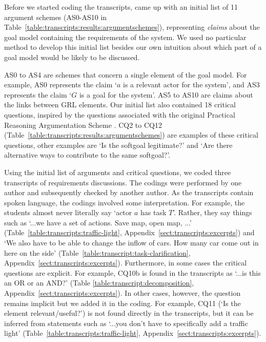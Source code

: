 Before we started coding the transcripts, came up with an initial list of 11 argument schemes (AS0-AS10 in Table~\ref{table:transcripts:results:argumentschemes}), representing \emph{claims} about the goal model containing the requirements of the system. We used no particular method to develop this initial list besides our own intuition about which part of a goal model would be likely to be discussed.

AS0 to AS4 are schemes that concern a single element of the goal model. For example, AS0 represents the claim `$a$ is a relevant actor for the system', and AS3 represents the claim `$G$ is a goal for the system'. AS5 to AS10 are claims about the links between GRL elements. Our initial list also contained 18 critical questions, inspired by the questions associated with the original Practical Reasoning Argumentation Scheme \cite{atkinson2007}. CQ2 to CQ12 (Table~\ref{table:transcripts:results:argumentschemes}) are examples of these critical questions, other examples are `Is the softgoal legitimate?' and `Are there alternative ways to contribute to the same softgoal?'.

Using the initial list of arguments and critical questions, we coded three transcripts of requirements discussions. The codings were performed by one author and subsequently checked by another author. As the transcripts contain spoken language, the codings involved some interpretation. For example, the students almost never literally say `actor $a$ has task $T$'. Rather, they say things such as `...we have a set of actions. Save map, open map, ...' (Table~\ref{table:transcripts:traffic-light}, Appendix~\ref{sect:transcripts:excerpts}) and `We also have to be able to change the inflow of cars. How many car come out in here on the side' (Table~\ref{table:transcript:task-clarification}, Appendix~\ref{sect:transcripts:excerpts}). Furthermore, in some cases the critical questions are explicit. For example, CQ10b is found in the transcripts as `...is this an OR or an AND?' (Table \ref{table:transcript:decomposition}, Appendix~\ref{sect:transcripts:excerpts}). In other cases, however, the question remains implicit but we added it in the coding. For example, CQ11 (`Is the element relevant/useful?') is not found directly in the transcripts, but it can be inferred from statements such as `...you don't have to specifically add a traffic light' (Table~\ref{table:transcripts:traffic-light}, Appendix~\ref{sect:transcripts:excerpts}). 

